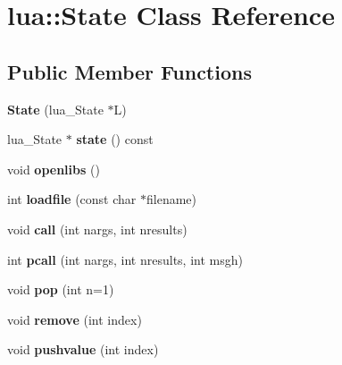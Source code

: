 \hypertarget{classlua_1_1State}{}\section{lua\+::State Class Reference}
\label{classlua_1_1State}
\subsection*{Public Member Functions}
\begin{DoxyCompactItemize}
\item 
\mbox{\label{classlua_1_1State_a9c4a8420956b85366165c3b30c29240e}} 
{\bfseries State} (lua\+\_\+\+State $\ast$L)
\item 
\mbox{\label{classlua_1_1State_a324f8b53a042c415c2b9975536155d0f}} 
lua\+\_\+\+State $\ast$ {\bfseries state} () const
\item 
\mbox{\label{classlua_1_1State_a453a6fa5ebbecac1f3f605d3787c8eb6}} 
void {\bfseries openlibs} ()
\item 
\mbox{\label{classlua_1_1State_aa889c55efd7eb4b9c3921e1fdf9e41bb}} 
int {\bfseries loadfile} (const char $\ast$filename)
\item 
\mbox{\label{classlua_1_1State_a1027ae103ab5add6f09efbc8568a2c53}} 
void {\bfseries call} (int nargs, int nresults)
\item 
\mbox{\label{classlua_1_1State_a0e21adad577d4fb240150e3c82914c90}} 
int {\bfseries pcall} (int nargs, int nresults, int msgh)
\item 
\mbox{\label{classlua_1_1State_af168818928399ff608b45eacfeb078a5}} 
void {\bfseries pop} (int n=1)
\item 
\mbox{\label{classlua_1_1State_a900759e80c3e59bc5b97f6267027623f}} 
void {\bfseries remove} (int index)
\item 
\mbox{\label{classlua_1_1State_a48d2798bb51cd6dfcd33590be6a98ff8}} 
void {\bfseries pushvalue} (int index)
\item 

\end{DoxyCompactItemize}
